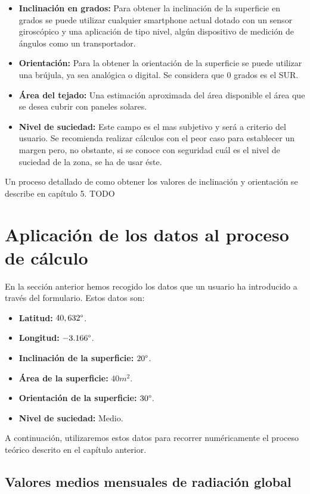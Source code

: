 \begin{itemize}
\item \textbf{Inclinación en grados:} Para obtener la inclinación de la superficie en grados se puede utilizar cualquier smartphone actual dotado con un sensor giroscópico y una aplicación de tipo nivel, algún dispositivo de medición de ángulos como un transportador.
\item \textbf{Orientación:} Para la obtener la orientación de la superficie se puede utilizar una brújula, ya sea analógica o digital. Se considera que 0 grados es el SUR.
\item \textbf{Área del tejado:} Una estimación aproximada del área disponible el área que se desea cubrir con paneles solares.
\item \textbf{Nivel de suciedad:} Este campo es el mas subjetivo y será a criterio del usuario. Se recomienda realizar cálculos con el peor caso para establecer un margen pero, no obstante, si se conoce con seguridad cuál es el nivel de suciedad de la zona, se ha de usar éste.
\end{itemize}

Un proceso detallado de como obtener los valores de inclinación y orientación se describe en capítulo 5. TODO

\section {Aplicación de los datos al proceso de cálculo}

En la sección anterior hemos recogido los datos que un usuario ha introducido a través del formulario. Estos datos son:
\begin{itemize}
\item \textbf{Latitud:} $40,632 \degree$.
\item \textbf{Longitud:} $-3.166 \degree$.
\item \textbf{Inclinación de la superficie:} $20 \degree$.
\item \textbf{Área de la superficie:} $40 m^2 $.
\item \textbf{Orientación de la superficie:} $30 \degree$.
\item \textbf{Nivel de suciedad:} Medio.
\end{itemize}

A continuación, utilizaremos estos datos para recorrer numéricamente el proceso teórico descrito en el capítulo anterior. 

\subsection{Valores medios mensuales de radiación global}

